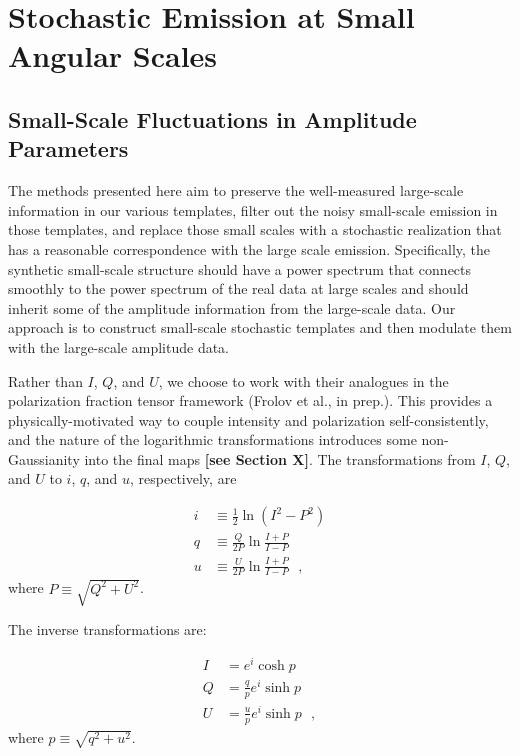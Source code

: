 \section{Stochastic Emission at Small Angular Scales} \label{sec:small_scales} 

\subsection{Small-Scale Fluctuations in Amplitude Parameters}\label{subsec:methodology}
The methods presented here aim to preserve the well-measured large-scale information in our various templates, filter out the noisy small-scale emission in those templates, and replace those small scales with a stochastic realization that has a reasonable correspondence with the large scale emission. Specifically, the synthetic small-scale structure should have a power spectrum that connects smoothly to the power spectrum of the real data at large scales and should inherit some of the amplitude information from the large-scale data. Our approach is to construct small-scale stochastic templates and then modulate them with the large-scale amplitude data.

Rather than $I$, $Q$, and $U$, we choose to work with their analogues in the polarization fraction tensor framework (Frolov et al., in prep.). This provides a physically-motivated way to couple intensity and polarization self-consistently, and the nature of the logarithmic transformations introduces some non-Gaussianity into the final maps {\bf [see Section X]}. The transformations from $I$, $Q$, and $U$ to $i$, $q$, and $u$, respectively, are

\begin{align}\label{eq:real2pt}
    i &\equiv \frac{1}{2} \ln (I^2 - P^2)\nonumber  \\
    q &\equiv  \frac{Q}{2P} \ln \frac{I+P}{I-P} \\
    u &\equiv  \frac{U}{2P} \ln \frac{I+P}{I-P}\nonumber 
    ~~~,
\end{align}
where $P \equiv \sqrt{Q^2 + U^2}$.

The inverse transformations are:

\begin{align}\label{eq:pt2real}
    I &= e^i \cosh p \nonumber \\
    Q &= \frac{q}{p}e^i\sinh p  \\
    U &= \frac{u}{p}e^i\sinh p \nonumber
    ~~~,
\end{align}
where $p \equiv \sqrt{q^2 + u^2}$.

